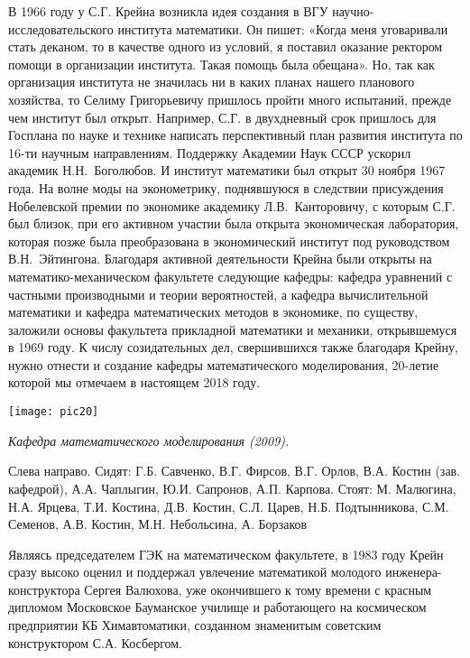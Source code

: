 В 1966 году у С.Г. Крейна возникла идея создания в ВГУ научно-исследовательского института математики. Он пишет: «Когда меня уговаривали стать деканом, то в качестве одного из условий, я поставил оказание ректором помощи в организации института. Такая помощь была обещана». Но, так как организация института не значилась ни в каких планах нашего планового хозяйства, то Селиму Григорьевичу пришлось пройти много испытаний, прежде чем институт был открыт. Например, С.Г. в двухдневный срок пришлось для Госплана по науке и технике написать перспективный план развития института по 16-ти научным направлениям. Поддержку Академии Наук СССР ускорил академик Н.Н.~Боголюбов. И институт математики был открыт 30      ноября 1967 года.
На волне моды на эконометрику, поднявшуюся в следствии присуждения Нобелевской премии по экономике академику Л.В.~Канторовичу, с которым С.Г. был близок, при его активном участии была открыта экономическая лаборатория, которая позже была преобразована в экономический институт под руководством В.Н.~Эйтингона. Благодаря активной деятельности Крейна были открыты на математико-механическом факультете следующие кафедры: кафедра уравнений с частными производными и теории вероятностей, а кафедра вычислительной математики и кафедра математических методов в экономике, по существу, заложили основы факультета прикладной математики и механики, открывшемуся в 1969 году.
К числу созидательных дел, свершившихся также благодаря Крейну, нужно отнести и создание кафедры математического моделирования, 20-летие которой мы отмечаем в настоящем 2018 году.


\begin{center}

\texttt{[image: pic20]}


{\it Кафедра математического моделирования (2009).

Слева направо. Сидят: Г.Б. Савченко, В.Г. Фирсов, В.Г. Орлов, В.А. Костин (зав. кафедрой), А.А. Чаплыгин, Ю.И. Сапронов, А.П. Карпова. Стоят: М. Малюгина, Н.А. Ярцева, Т.И. Костина, Д.В. Костин, С.Л. Царев, Н.Б. Подтынникова, С.М. Семенов, А.В. Костин, М.Н. Небольсина, А. Борзаков
}
\end{center}

Являясь председателем ГЭК на математическом факультете, в 1983 году Крейн сразу высоко оценил и поддержал увлечение математикой молодого инженера-конструктора Сергея Валюхова, уже окончившего к тому времени с красным дипломом Московское Бауманское училище и работающего на космическом предприятии КБ Химавтоматики, созданном знаменитым советским конструктором С.А. Косбергом.


